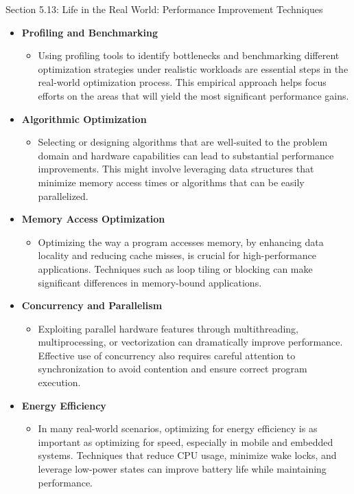 \begin{notes}{Section 5.13: Life in the Real World: Performance Improvement Techniques}
    \begin{itemize}
        \item \textbf{Profiling and Benchmarking}
        \begin{itemize}
            \item Using profiling tools to identify bottlenecks and benchmarking different optimization strategies under realistic workloads are essential steps in the real-world optimization process. 
            This empirical approach helps focus efforts on the areas that will yield the most significant performance gains.
        \end{itemize}
        \item \textbf{Algorithmic Optimization}
        \begin{itemize}
            \item Selecting or designing algorithms that are well-suited to the problem domain and hardware capabilities can lead to substantial performance improvements. This might involve leveraging 
            data structures that minimize memory access times or algorithms that can be easily parallelized.
        \end{itemize}
        \item \textbf{Memory Access Optimization}
        \begin{itemize}
            \item Optimizing the way a program accesses memory, by enhancing data locality and reducing cache misses, is crucial for high-performance applications. Techniques such as loop tiling or 
            blocking can make significant differences in memory-bound applications.
        \end{itemize}
        \item \textbf{Concurrency and Parallelism}
        \begin{itemize}
            \item Exploiting parallel hardware features through multithreading, multiprocessing, or vectorization can dramatically improve performance. Effective use of concurrency also requires 
            careful attention to synchronization to avoid contention and ensure correct program execution.
        \end{itemize}
        \item \textbf{Energy Efficiency}
        \begin{itemize}
            \item In many real-world scenarios, optimizing for energy efficiency is as important as optimizing for speed, especially in mobile and embedded systems. Techniques that reduce CPU usage, 
            minimize wake locks, and leverage low-power states can improve battery life while maintaining performance.
        \end{itemize}
    \end{itemize}
    

\end{notes}
